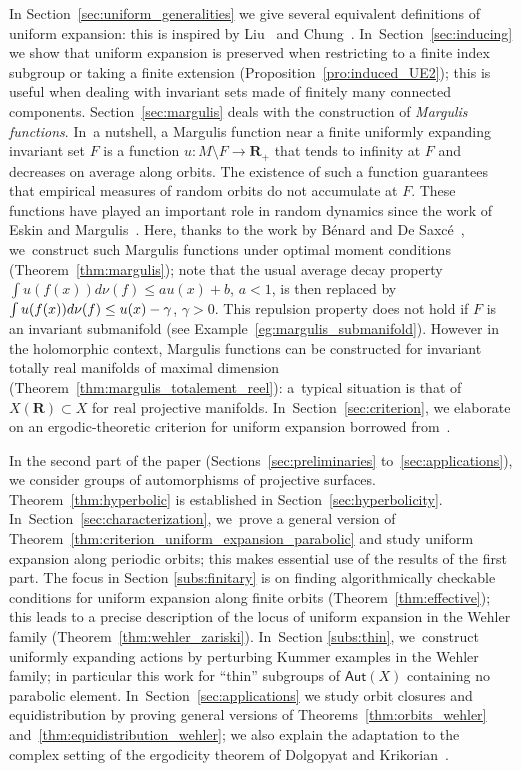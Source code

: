 \documentclass[JEP,XML,SOM,Unicode,published]{cedram}
\def\R{\mathbf{R}}
\newcommand\Aut{\mathsf{Aut}}
\theoremstyle{plain}
\theoremstyle{definition}
\begin{document}
In Section~\ref{sec:uniform_generalities} we give several equivalent definitions of uniform expansion:
this is inspired by Liu~\cite{liu_thesis} and Chung~\cite{chung}. In~Section~\ref{sec:inducing} we show that uniform expansion is preserved
when restricting to a finite index
subgroup or taking a finite extension (Proposition~\ref{pro:induced_UE2}); this
is useful when dealing with invariant sets made of finitely many connected components. Section~\ref{sec:margulis} deals with the construction of
\emph{Margulis functions}. In~a nutshell, a Margulis function
near a finite uniformly expanding invariant set $F$ is a function
$u:M\setminus F\to \R_+$ that tends to infinity at $F$ and decreases on average along orbits.
The existence of such a function
guarantees that empirical measures of random orbits do not accumulate at $F$. These functions have played an
important role in random dynamics since the work of Eskin and Margulis~\cite{eskin-margulis}.
Here, thanks to the work by Bénard and De Saxcé~\cite{benard-desaxce}, we~construct such Margulis functions under optimal moment conditions (Theorem~\ref{thm:margulis});
note that the usual average
decay property $\int u (f(x)) d\nu(f) \leq a u(x)+b$, $a<1$, is then replaced by $\int u (f(x)) d\nu(f) \leq u(x) -\nobreak \gamma$, $\gamma>0$. This repulsion property does not hold if $F$ is an invariant submanifold (see Example~\ref{eg:margulis_submanifold}). However in the holomorphic context, Margulis functions
can be constructed for invariant
totally real manifolds of maximal dimension (Theorem~\ref{thm:margulis_totalement_reel}): a~typical situation
is that of $X(\R)\subset X$ for real projective manifolds. In~Section~\ref{sec:criterion}, we elaborate on an ergodic-theoretic criterion for uniform expansion borrowed
from~\cite{chung}.

In the second part of the paper (Sections~\ref{sec:preliminaries} to~\ref{sec:applications}), we
consider groups of automorphisms of projective surfaces. Theorem~\ref{thm:hyperbolic}
is established in Section~\ref{sec:hyperbolicity}. In~Section~\ref{sec:characterization}, we~prove a general version of
Theorem~\ref{thm:criterion_uniform_expansion_parabolic} and
study uniform expansion along periodic orbits; this makes essential use of the results of the first part.
The focus in Section \ref{subs:finitary} is on finding
algorithmically checkable conditions for uniform expansion along finite orbits (Theorem~\ref{thm:effective});
this leads to a precise description of the locus of uniform expansion in the Wehler family (Theorem~\ref{thm:wehler_zariski}). In~Section \ref{subs:thin}, we~construct uniformly expanding actions by perturbing Kummer examples in the Wehler family;
in particular this work for ``thin'' subgroups of $\Aut(X)$ containing no parabolic element. In~Section~\ref{sec:applications} we study orbit closures and equidistribution by proving
general versions of Theorems~\ref{thm:orbits_wehler} and~\ref{thm:equidistribution_wehler};
we also explain the adaptation to the complex setting of the ergodicity
theorem of Dolgopyat and Krikorian~\cite{dolgopyat-krikorian}.
\end{document}
